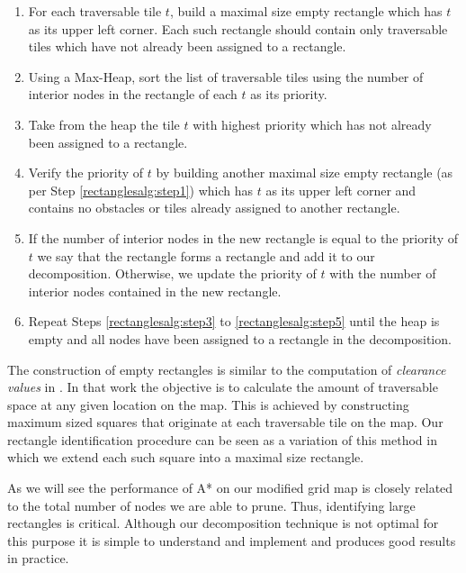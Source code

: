 \begin{enumerate}

\item{\label{rectanglesalg:step1} For each traversable tile $t$, build a maximal size empty
rectangle which has $t$ as its upper left corner. Each such rectangle should contain only
traversable tiles which have not already been assigned to a rectangle.}

\item{\label{rectanglesalg:step2} Using a Max-Heap, sort the list of traversable tiles using the number of
interior nodes in the rectangle of each $t$ as its priority.}

\item{\label{rectanglesalg:step3} Take from the heap the tile $t$ with highest priority
which has not already been assigned to a rectangle. }

\item{\label{rommsalg:step4} Verify the priority of $t$ by building another maximal size
empty rectangle (as per Step \ref{rectanglesalg:step1}) which has $t$ as its upper
left corner and contains no obstacles or tiles already assigned to another rectangle.}

\item{\label{rectanglesalg:step5} If the number of interior nodes in the new rectangle is equal to the 
priority of $t$ we say that the rectangle forms a rectangle and add it to our decomposition. 
Otherwise, we update the priority of $t$ with the number of interior 
nodes contained in the new rectangle. }

\item{\label{rectanglesalg:step6} Repeat Steps \ref{rectanglesalg:step3} to \ref{rectanglesalg:step5} until the heap is
empty and all nodes have been assigned to a rectangle in the decomposition.}

\end{enumerate}

The construction of empty rectangles is similar to the computation of \emph{clearance
values} in \citep{harabor08}.  In that work the objective is to calculate the
amount of traversable space at any given location on the map.  This is achieved
by constructing maximum sized squares that originate at each traversable tile on
the map.  Our rectangle identification procedure can be seen as a variation of this
method in which we extend each such square into a maximal size rectangle.
\par
As we will see the performance of A* on our modified grid map is closely related
to the total number of nodes we are able to prune.  Thus, identifying large
rectangles is critical.  Although our decomposition technique is not optimal for this
purpose it is simple to understand and implement and produces good results in
practice.
